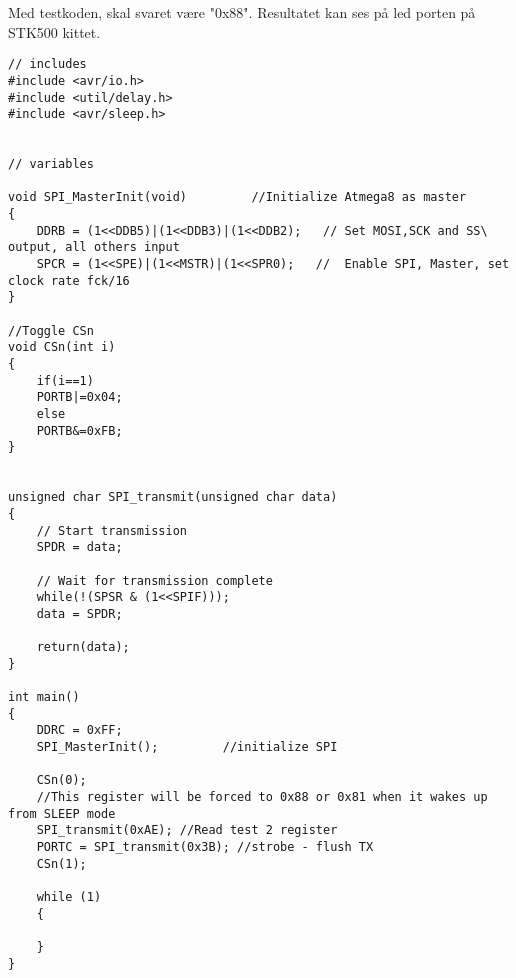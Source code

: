 \documentclass[Main]{subfiles}
\begin{document}
Med testkoden, skal svaret være "0x88". Resultatet kan ses på led porten på STK500 kittet.

\begin{lstlisting}[caption=SPI test, style=Code-C, label=lst:itocLEs]
// includes
#include <avr/io.h>
#include <util/delay.h>
#include <avr/sleep.h>


// variables

void SPI_MasterInit(void)         //Initialize Atmega8 as master
{
	DDRB = (1<<DDB5)|(1<<DDB3)|(1<<DDB2);   // Set MOSI,SCK and SS\ output, all others input
	SPCR = (1<<SPE)|(1<<MSTR)|(1<<SPR0);   //  Enable SPI, Master, set clock rate fck/16
}

//Toggle CSn
void CSn(int i)
{
	if(i==1)
	PORTB|=0x04;
	else
	PORTB&=0xFB;
}


unsigned char SPI_transmit(unsigned char data)
{
	// Start transmission
	SPDR = data;

	// Wait for transmission complete
	while(!(SPSR & (1<<SPIF)));
	data = SPDR;

	return(data);
}

int main()
{
    DDRC = 0xFF;
	SPI_MasterInit();         //initialize SPI
	
	CSn(0);
	//This register will be forced to 0x88 or 0x81 when it wakes up from SLEEP mode
	SPI_transmit(0xAE); //Read test 2 register
	PORTC = SPI_transmit(0x3B); //strobe - flush TX
	CSn(1);

	while (1)
	{

	}
}
\end{lstlisting}
\end{document}
